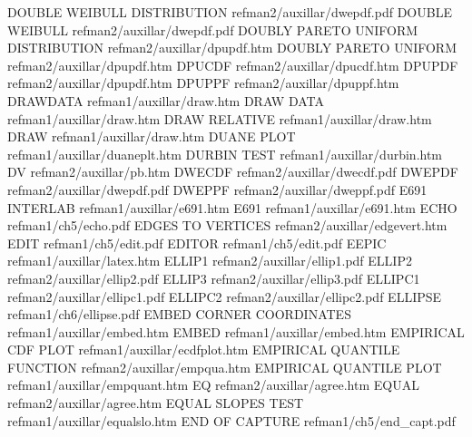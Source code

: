 DOUBLE WEIBULL DISTRIBUTION             refman2/auxillar/dwepdf.pdf
DOUBLE WEIBULL                          refman2/auxillar/dwepdf.pdf
DOUBLY PARETO UNIFORM DISTRIBUTION      refman2/auxillar/dpupdf.htm
DOUBLY PARETO UNIFORM                   refman2/auxillar/dpupdf.htm
DPUCDF                                  refman2/auxillar/dpucdf.htm
DPUPDF                                  refman2/auxillar/dpupdf.htm
DPUPPF                                  refman2/auxillar/dpuppf.htm
DRAWDATA                                refman1/auxillar/draw.htm
DRAW DATA                               refman1/auxillar/draw.htm
DRAW RELATIVE                           refman1/auxillar/draw.htm
DRAW                                    refman1/auxillar/draw.htm
DUANE PLOT                              refman1/auxillar/duaneplt.htm
DURBIN TEST                             refman1/auxillar/durbin.htm
DV                                      refman2/auxillar/pb.htm
DWECDF                                  refman2/auxillar/dwecdf.pdf
DWEPDF                                  refman2/auxillar/dwepdf.pdf
DWEPPF                                  refman2/auxillar/dweppf.pdf
E691 INTERLAB                           refman1/auxillar/e691.htm
E691                                    refman1/auxillar/e691.htm
ECHO                                    refman1/ch5/echo.pdf
EDGES TO VERTICES                       refman2/auxillar/edgevert.htm
EDIT                                    refman1/ch5/edit.pdf
EDITOR                                  refman1/ch5/edit.pdf
EEPIC                                   refman1/auxillar/latex.htm
ELLIP1                                  refman2/auxillar/ellip1.pdf
ELLIP2                                  refman2/auxillar/ellip2.pdf
ELLIP3                                  refman2/auxillar/ellip3.pdf
ELLIPC1                                 refman2/auxillar/ellipc1.pdf
ELLIPC2                                 refman2/auxillar/ellipc2.pdf
ELLIPSE                                 refman1/ch6/ellipse.pdf
EMBED CORNER COORDINATES                refman1/auxillar/embed.htm
EMBED                                   refman1/auxillar/embed.htm
EMPIRICAL CDF PLOT                      refman1/auxillar/ecdfplot.htm
EMPIRICAL QUANTILE FUNCTION             refman2/auxillar/empqua.htm
EMPIRICAL QUANTILE PLOT                 refman1/auxillar/empquant.htm
EQ                                      refman2/auxillar/agree.htm
EQUAL                                   refman2/auxillar/agree.htm
EQUAL SLOPES TEST                       refman1/auxillar/equalslo.htm
END OF CAPTURE                          refman1/ch5/end_capt.pdf
